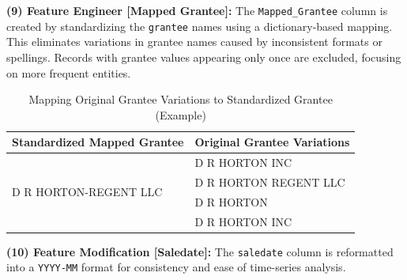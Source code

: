 \textbf{(9) Feature Engineer [Mapped Grantee]:} The \texttt{Mapped\_Grantee}
column is created by standardizing the \texttt{grantee} names using a dictionary-based
mapping. This eliminates variations in grantee names caused by inconsistent
formats or spellings. Records with grantee values appearing only once are excluded,
focusing on more frequent entities.
\begin{table}[h!]
	\centering
	\caption{Mapping Original Grantee Variations to Standardized Grantee (Example)}
	\renewcommand{\arraystretch}{1} %
	\setlength{\tabcolsep}{8pt} %
	\begin{tabular}{|l|l|}
		\hline
		\textbf{Standardized Mapped Grantee}   & \textbf{Original Grantee Variations} \\
		\hline
		\multirow{4}{*}{D R HORTON-REGENT LLC} & D R HORTON INC                       \\
		                                       & D R HORTON REGENT LLC                \\
		                                       & D R HORTON                           \\
		                                       & D R HORTON INC                       \\
		\hline
	\end{tabular}
\end{table}

\textbf{(10) Feature Modification [Saledate]:} The \texttt{saledate} column is
reformatted into a \texttt{YYYY-MM} format for consistency and ease of time-series
analysis.


